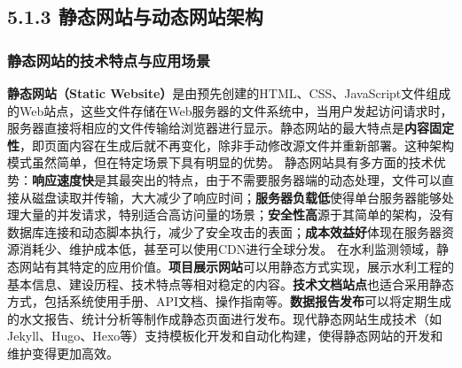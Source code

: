 \subsection{5.1.3 静态网站与动态网站架构}\label{ux9759ux6001ux7f51ux7ad9ux4e0eux52a8ux6001ux7f51ux7ad9ux67b6ux6784}
\subsubsection{静态网站的技术特点与应用场景}\label{ux9759ux6001ux7f51ux7ad9ux7684ux6280ux672fux7279ux70b9ux4e0eux5e94ux7528ux573aux666f}
\textbf{静态网站（Static
Website）}是由预先创建的HTML、CSS、JavaScript文件组成的Web站点，这些文件存储在Web服务器的文件系统中，当用户发起访问请求时，服务器直接将相应的文件传输给浏览器进行显示。静态网站的最大特点是\textbf{内容固定性}，即页面内容在生成后就不再变化，除非手动修改源文件并重新部署。这种架构模式虽然简单，但在特定场景下具有明显的优势。
静态网站具有多方面的技术优势：\textbf{响应速度快}是其最突出的特点，由于不需要服务器端的动态处理，文件可以直接从磁盘读取并传输，大大减少了响应时间；\textbf{服务器负载低}使得单台服务器能够处理大量的并发请求，特别适合高访问量的场景；\textbf{安全性高}源于其简单的架构，没有数据库连接和动态脚本执行，减少了安全攻击的表面；\textbf{成本效益好}体现在服务器资源消耗少、维护成本低，甚至可以使用CDN进行全球分发。
在水利监测领域，静态网站有其特定的应用价值。\textbf{项目展示网站}可以用静态方式实现，展示水利工程的基本信息、建设历程、技术特点等相对稳定的内容。\textbf{技术文档站点}也适合采用静态方式，包括系统使用手册、API文档、操作指南等。\textbf{数据报告发布}可以将定期生成的水文报告、统计分析等制作成静态页面进行发布。现代静态网站生成技术（如Jekyll、Hugo、Hexo等）支持模板化开发和自动化构建，使得静态网站的开发和维护变得更加高效。
